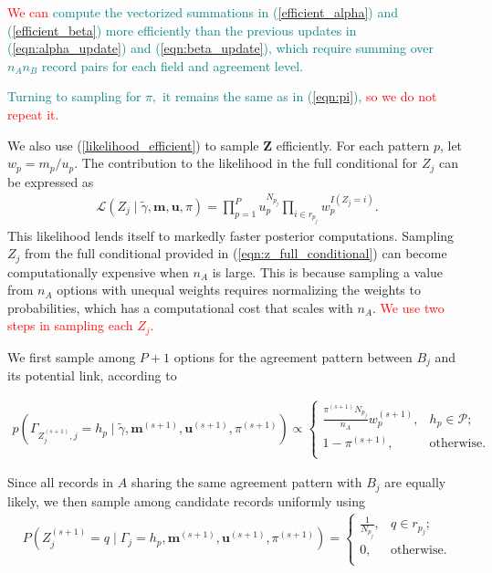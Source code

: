 \documentclass[ba]{imsart}
\begin{document}
\textcolor{teal}{\textcolor{red}{We can} compute the vectorized summations in (\ref{efficient_alpha}) and (\ref{efficient_beta}) more efficiently than the previous updates in (\ref{eqn:alpha_update}) and (\ref{eqn:beta_update}), which require summing over $n_A n_B$ record pairs for each field and agreement level.}

\textcolor{teal}{Turning to sampling for $\pi,$ it remains the same as in (\ref{eqn:pi}), \textcolor{red}{so we do not repeat it.} }

We also use (\ref{likelihood_efficient}) to sample $\bm{Z}$ efficiently. For each pattern $p$, let $w_p = m_p/u_p$.  The contribution to the likelihood in the full conditional for $Z_j$ can be expressed as
\begin{align}
	\mathcal{L}(Z_j\mid  \tilde{\gamma}, \bm{m}, \bm{u}, \pi) = \prod_{p=1}^P u_p^{N_{p_j}} \prod_{i \in r_{p_j}} w_p^{I(Z_j = i)}. \label{likelihood_efficient_z}
\end{align}
This likelihood lends itself to markedly faster posterior computations. Sampling $Z_j$ from the full conditional provided in (\ref{eqn:z_full_conditional}) can become computationally expensive when $n_A$ is large. This is because sampling a value from $n_A$ options with unequal weights requires normalizing the weights to probabilities, which has a computational cost that scales with $n_A$. \textcolor{red}{We use two steps in sampling each $Z_j$.}

We first sample among $P + 1$ options for the agreement pattern between $B_j$ and its potential link, according to

\begin{align}
	\label{eqn:gibbs1}
	p\left( \Gamma_{Z_j^{(s+1)},j} = h_p \mid \tilde{\gamma}, \bm{m}^{(s+1)}, \bm{u}^{(s+1)}, \pi^{(s+1)}\right) \propto
	\begin{cases} 
                 \frac{\pi^{(s+1)}N_{p_j}}{n_A}  w_{p}^{(s+1)},  & h_p \in \mathcal{P}; \\
		1- \pi^{(s+1)} , &   \text{otherwise}. \\
	\end{cases}
\end{align}

Since all records in $A$ sharing the same agreement pattern with $B_j$ are equally likely, we then sample among candidate records uniformly using
\begin{align}
	\label{eqn:gibbs2}
P\left(Z_j^{(s+1)} = q \mid \Gamma_j=h_p, \bm{m}^{(s+1)}, \bm{u}^{(s+1)}, \pi^{(s+1)} \right) 
	= 
	\begin{cases} 
		\frac{1}{N_{p_j}}, & q \in r_{p_j}; \\
		0, & \text{otherwise.} \\
	\end{cases}
\end{align} 
\end{document}
